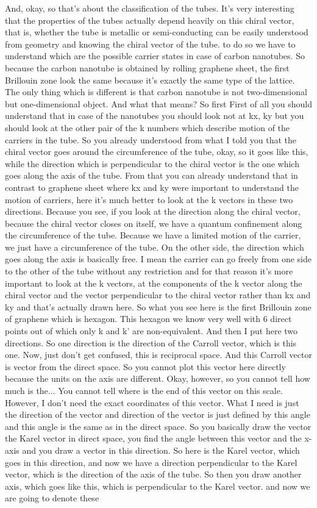 And, okay, so that's about the classification of the tubes. It's very interesting that the properties of the tubes actually depend heavily on this chiral vector, that is, whether the tube is metallic or semi-conducting can be easily understood from geometry and knowing the chiral vector of the tube. to do so we have to understand which are the possible carrier states in case of carbon nanotubes. So because the carbon nanotube is obtained by rolling graphene sheet, the first Brillouin zone look the same because it's exactly the same type of the lattice. The only thing which is different is that carbon nanotube is not two-dimensional but one-dimensional object. And what that means? So first First of all you should understand that in case of the nanotubes you should look not at kx, ky but you should look at the other pair of the k numbers which describe motion of the carriers in the tube. So you already understood from what I told you that the chiral vector goes around the circumference of the tube, okay, so it goes like this, while the direction which is perpendicular to the chiral vector is the one which goes along the axis of the tube. From that you can already understand that in contrast to graphene sheet where kx and ky were important to understand the motion of carriers, here it's much better to look at the k vectors in these two directions. Because you see, if you look at the direction along the chiral vector, because the chiral vector closes on itself, we have a quantum confinement along the circumference of the tube. Because we have a limited motion of the carrier, we just have a circumference of the tube. On the other side, the direction which goes along the axis is basically free. I mean the carrier can go freely from one side to the other of the tube without any restriction and for that reason it's more important to look at the k vectors, at the components of the k vector along the chiral vector and the vector perpendicular to the chiral vector rather than kx and ky and that's actually drawn here. So what you see here is the first Brillouin zone of graphene which is hexagon. This hexagon we know very well with 6 direct points out of which only k and k' are non-equivalent. And then I put here two directions. So one direction is the direction of the Carroll vector, which is this one. Now, just don't get confused, this is reciprocal space. And this Carroll vector is vector from the direct space. So you cannot plot this vector here directly because the units on the axis are different. Okay, however, so you cannot tell how much is the... You cannot tell where is the end of this vector on this scale. However, I don't need the exact coordinates of this vector. What I need is just the direction of the vector and direction of the vector is just defined by this angle and this angle is the same as in the direct space. So you basically draw the vector the Karel vector in direct space, you find the angle between this vector and the x-axis and you draw a vector in this direction. So here is the Karel vector, which goes in this direction, and now we have a direction perpendicular to the Karel vector, which is the direction of the axis of the tube. So then you draw another axis, which goes like this, which is perpendicular to the Karel vector. and now we are going to denote these 